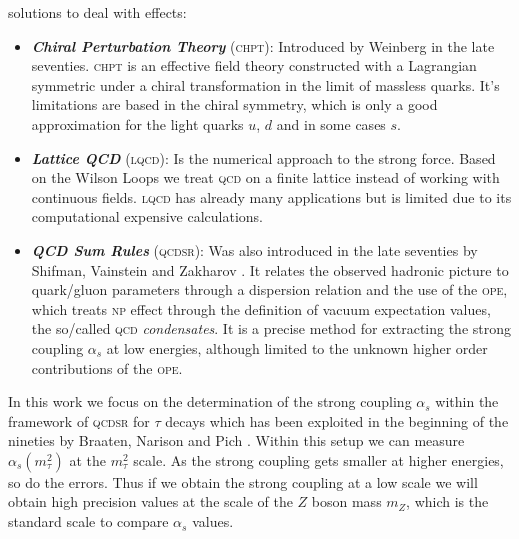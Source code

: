 \documentclass[../../index.tex]{subfiles}
\begin{document}
solutions to deal with  effects:
\begin{itemize}
\item \textbf{\textit{Chiral Perturbation Theory}}
  (\textsc{chpt}):
  Introduced by Weinberg \cite{Weinberg1978} in the late seventies.
  \textsc{chpt} is an effective field theory constructed with a Lagrangian
  symmetric under a chiral transformation in the limit of massless quarks. It's
  limitations are based in the chiral symmetry, which is only a good
  approximation for the light quarks \(u\), \(d\) and in some cases \(s\).
\item \textbf{\textit{Lattice QCD}}
  (\textsc{lqcd}):
  Is the numerical approach to the strong force. Based on the Wilson Loops
  \cite{Wilson1974} we treat \textsc{qcd} on a finite lattice instead of working
  with continuous fields. \textsc{lqcd} has already many applications but is
  limited due to its computational expensive calculations.
\item \textbf{\textit{QCD Sum Rules}}
  (\textsc{qcdsr}): Was also introduced in the late seventies by Shifman, Vainstein and
  Zakharov \cite{Shifman1978,Shifman1978a}. It relates the observed hadronic
  picture to quark\-/gluon parameters through a dispersion relation and the use
  of the \textsc{ope}, which treats \textsc{np}
  effect through the definition of vacuum expectation values, the so\-/called
  \textsc{qcd} \textit{condensates}. It is a precise method for extracting the
  strong coupling \(\alpha_s\) at low energies, although limited to the unknown
  higher order contributions of the \textsc{ope}.
\end{itemize}


In this work we focus on the determination of the strong coupling \(\alpha_s\)
within the framework of \textsc{qcdsr} for \(\tau\) decays which has been
exploited in the beginning of the nineties by Braaten, Narison and Pich
\cite{Braaten1991}. Within this setup we can measure \(\alpha_s(m_\tau^2)\) at
the \(m_\tau^2\) scale. As the strong coupling gets smaller at higher energies,
so do the errors. Thus if we obtain the strong coupling at a low scale we will
obtain high precision values at the scale of the \(Z\) boson mass \(m_Z\), which
is the standard scale to compare \(\alpha_s\) values.
\end{document}
